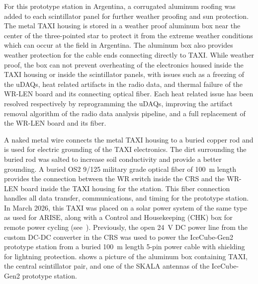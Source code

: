 For this prototype station in Argentina, a corrugated aluminum roofing was added to each scintillator panel for further weather proofing and sun protection.
The metal TAXI housing is stored in a weather proof aluminum box near the center of the three-pointed star to protect it from the extreme weather conditions which can occur at the field in Argentina.
The aluminum box also provides weather protection for the cable ends connecting directly to TAXI.
While weather proof, the box can not prevent overheating of the electronics housed inside the TAXI housing or inside the scintillator panels, with issues such as a freezing of the uDAQs, heat related artifacts in the radio data, and thermal failure of the WR-LEN board and its connecting optical fiber.
Each heat related issue has been resolved respectively by reprogramming the uDAQs, improving the artifact removal algorithm of the radio data analysis pipeline, and a full replacement of the WR-LEN board and its fiber.



A naked metal wire connects the metal TAXI housing to a buried copper rod and is used for electric grounding of the TAXI electronics.
The dirt surrounding the buried rod was salted to increase soil conductivity and provide a better grounding.
A buried OS2 9/125 military grade optical fiber of \qty{100}{\meter} length provides the connection between the WR switch inside the CRS and the WR-LEN board inside the TAXI housing for the station.
This fiber connection handles all data transfer, communications, and timing for the prototype station.
In March 2026, this TAXI was placed on a solar power system of the same type as used for ARISE, along with a Control and Housekeeping (CHK) box for remote power cycling (see~).
Previously, the open \qty{24}{\volt} DC power line from the custom DC-DC converter in the CRS was used to power the IceCube-Gen2 prototype station from a buried \qty{100}{\meter} length 5-pin power cable with shielding for lightning protection.
 shows a picture of the aluminum box containing TAXI, the central scintillator pair, and one of the SKALA antennas of the IceCube-Gen2 prototype station.

